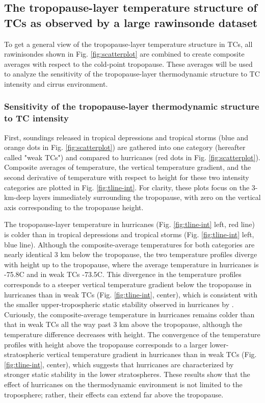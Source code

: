 \subsection{The tropopause-layer temperature structure of TCs as observed by a large rawinsonde dataset}

To get a general view of the tropopause-layer temperature structure in TCs, all rawinisondes shown in Fig. \ref{fig:scatterplot} are combined to create composite averages with respect to the cold-point tropopause.
These averages will be used to analyze the sensitivity of the tropopause-layer thermodynamic structure to TC intensity and cirrus environment.

\subsubsection{Sensitivity of the tropopause-layer thermodynamic structure to TC intensity}
First, soundings released in tropical depressions and tropical storms (blue and orange dots in Fig. \ref{fig:scatterplot}) are gathered into one category (hereafter called "weak TCs") and compared to hurricanes (red dots in Fig. \ref{fig:scatterplot}).
Composite averages of temperature, the vertical temperature gradient, and the second derivative of temperature with respect to height for these two intensity categories are plotted in Fig. \ref{fig:tline-int}.
For clarity, these plots focus on the 3-km-deep layers immediately surrounding the tropopause, with zero on the vertical axis corresponding to the tropopause height.

The tropopause-layer temperature in hurricanes (Fig. \ref{fig:tline-int} left, red line) is colder than in tropical depressions and tropical storms (Fig. \ref{fig:tline-int} left, blue line).
Although the composite-average temperatures for both categories are nearly identical 3 km below the tropopause, the two temperature profiles diverge with height up to the tropopause, where the average temperature in hurricanes is -75.8\textdegree{}C and in weak TCs -73.5\textdegree{}C.
This divergence in the temperature profiles corresponds to a steeper vertical temperature gradient below the tropopause in hurricanes than in weak TCs (Fig. \ref{fig:tline-int}, center), which is consistent with the smaller upper-tropospheric static stability observed in hurricanes by \cite{DuranMolinari2016}.
Curiously, the composite-average temperature in hurricanes remains colder than that in weak TCs all the way past 3 km above the tropopause, although the temperature difference decreases with height.
The convergence of the temperature profiles with height above the tropopause corresponds to a larger lower-stratospheric vertical temperature gradient in hurricanes than in weak TCs (Fig. \ref{fig:tline-int}, center), which suggests that hurricanes are characterized by stronger static stability in the lower stratospheres.
These results show that the effect of hurricanes on the thermodynamic environment is not limited to the troposphere; rather, their effects can extend far above the tropopause.

